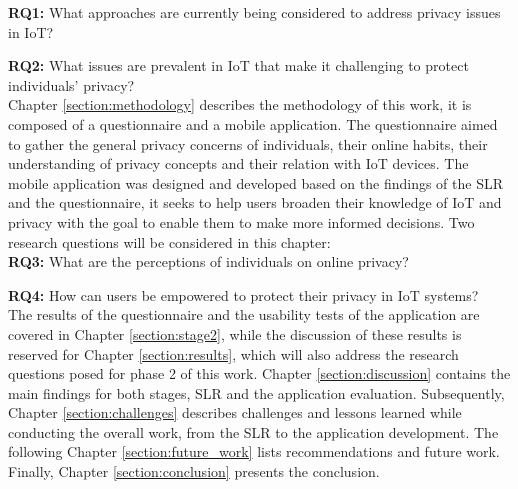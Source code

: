 
\textbf{RQ1:} What approaches are currently being considered to address privacy
issues in IoT?

\textbf{RQ2:} What issues are prevalent in IoT that make it challenging to
protect individuals' privacy? \\

Chapter \ref{section:methodology} describes the methodology of this work, it is composed of a
questionnaire and a mobile application. The questionnaire aimed to gather
the general privacy concerns of individuals, their online habits, their
understanding of privacy concepts and their relation with IoT devices.
The mobile application was designed and developed based on the findings
of the SLR and the questionnaire, it seeks to help users broaden their
knowledge of IoT and privacy with the goal to enable them to make more
informed decisions. Two research questions will be considered in this
chapter:\\


\textbf{RQ3:} What are the perceptions of individuals on online privacy?

\textbf{RQ4:} How can users be empowered to protect their privacy in IoT systems?\\

The results of the questionnaire and the usability tests of the application are
covered in Chapter \ref{section:stage2}, while the discussion of these results is reserved for
Chapter \ref{section:results}, which will also address the research questions posed for phase 2 of
this work. Chapter \ref{section:discussion} contains the main findings for both stages, SLR and the
application evaluation. Subsequently, Chapter \ref{section:challenges} describes challenges and lessons
learned while conducting the overall work, from the SLR to the application
development. The following Chapter \ref{section:future_work} lists recommendations and future work.
Finally, Chapter \ref{section:conclusion} presents the conclusion.
